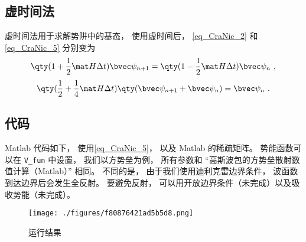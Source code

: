 \subsection{虚时间法}
虚时间法用于求解势阱中的基态， 使用虚时间后， \autoref{eq_CraNic_2} 和\autoref{eq_CraNic_5} 分别变为
\begin{equation}
\qty(1+\frac12\mat H\Delta t)\bvec\psi_{n+1} = \qty(1-\frac12\mat H\Delta t)\bvec\psi_n~,
\end{equation}
\begin{equation}
\qty(\frac12 + \frac14\mat H\Delta t)\qty(\bvec\psi_{n+1}+\bvec\psi_n) = \bvec\psi_n~.
\end{equation}

\subsection{代码}
Matlab 代码如下， 使用\autoref{eq_CraNic_5}， 以及 Matlab 的稀疏矩阵。 势能函数可以在 \verb|V_fun| 中设置， 我们以方势垒为例， 所有参数和 “高斯波包的方势垒散射数值计算（Matlab）” 相同。 不同的是， 由于我们使用迪利克雷边界条件， 波函数到达边界后会发生全反射。 要避免反射， 可以用开放边界条件（未完成）以及吸收势能（未完成）。

\begin{figure}[ht]
\centering
\texttt{[image: ./figures/f80876421ad5b5d8.png]}
\caption{运行结果} \label{fig_CraNic_1}
\end{figure}

